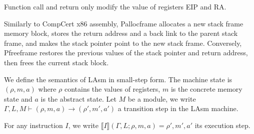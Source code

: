Function call and return only modify the value of registers \textsf{EIP} and \textsf{RA}.

Similarly to CompCert x86 assembly, \textsf{Pallocframe} allocates a
new stack frame memory block, stores the return address and a back
link to the parent stack frame, and makes the stack pointer point to
the new stack frame. Conversely, \textsf{Pfreeframe} restores the
previous values of the stack pointer and return address, then frees
the current stack block.

We define the semantics of LAsm in small-step form. The machine
state is $(\rho, m, a)$ where $\rho$ contains the values of registers,
$m$ is the concrete memory state and $a$ is the abstract state.  Let
$M$ be a module, we write $\Gamma, L, M \vdash (\rho, m, a)
\rightarrow (\rho', m', a')$ a transition step in the LAsm machine.

For any instruction $I$, we write $\llbracket I \rrbracket (\Gamma, L;
\rho, m, a) = \rho', m', a'$ its execution step.

